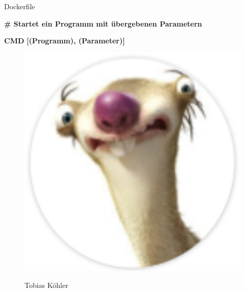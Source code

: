 \documentclass[final]{beamer}
\newlength{\onecolwid}
\begin{document}
\begin{frame}
\begin{columns}[t]
\begin{column}{\onecolwid}
\begin{block}{Dockerfile}
\vspace{1cm}
\par \textcolor{docker-green}{\textbf{\# Startet ein Programm mit übergebenen Parametern}}
\par \textcolor{docker-pu}{\textbf{CMD}} \textcolor{docker-red}{\textbf{[(Programm), (Parameter)]}}

\vspace{3cm}

\begin{figure}
\begin{minipage}[t]{0.40\textwidth}\vspace{0pt} 
\includegraphics[width=1.0\textwidth]{tobiaskohler} 
\begin{center}
	Tobias Köhler
\end{center}
\end{minipage}\hfill%
\begin{minipage}[t]{0.40\textwidth}\vspace{0pt} 

\end{minipage}
\end{figure}
\end{block}
\end{column}
\end{columns}
\end{frame}
\end{document}
